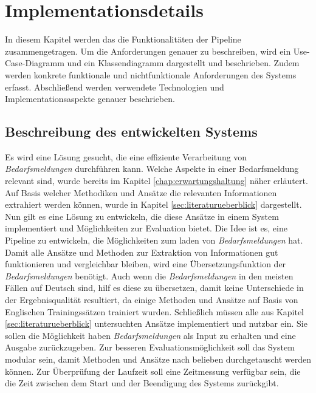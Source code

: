 \chapter{Implementationsdetails}
\label{chap:implementierung}
In diesem Kapitel werden das die Funktionalitäten der Pipeline zusammengetragen. Um die Anforderungen genauer zu beschreiben, wird ein Use-Case-Diagramm und ein Klassendiagramm dargestellt und beschrieben. Zudem werden konkrete funktionale und nichtfunktionale Anforderungen des Systems erfasst. Abschließend werden verwendete Technologien und Implementationsaspekte genauer beschrieben.
\section{Beschreibung des entwickelten Systems}
\label{sec:beschreibungsystem}
Es wird eine Lösung gesucht, die eine effiziente Verarbeitung von \emph{Bedarfsmeldungen} durchführen kann. Welche Aspekte in einer Bedarfsmeldung relevant sind, wurde bereits im Kapitel \ref{chap:erwartungshaltung} näher erläutert. Auf Basis welcher Methodiken und Ansätze die relevanten Informationen extrahiert werden können, wurde in Kapitel \ref{sec:literaturueberblick} dargestellt. Nun gilt es eine Lösung zu entwickeln, die diese Ansätze in einem System implementiert und Möglichkeiten zur Evaluation bietet. Die Idee ist es, eine Pipeline zu entwickeln, die Möglichkeiten zum laden von \emph{Bedarfsmeldungen} hat. Damit alle Ansätze und Methoden zur Extraktion von Informationen gut funktionieren und vergleichbar bleiben, wird eine Übersetzungsfunktion der \emph{Bedarfsmeldungen} benötigt. Auch wenn die \emph{Bedarfsmeldungen} in den meisten Fällen auf Deutsch sind, hilf es diese zu übersetzen, damit keine Unterschiede in der Ergebnisqualität resultiert, da einige Methoden und Ansätze auf Basis von Englischen Trainingssätzen trainiert wurden. Schließlich müssen alle aus Kapitel \ref{sec:literaturueberblick} untersuchten Ansätze implementiert und nutzbar ein. Sie sollen die Möglichkeit haben \emph{Bedarfsmeldungen} als Input zu erhalten und eine Ausgabe zurückzugeben. Zur besseren Evaluationsmöglichkeit soll das System modular sein, damit Methoden und Ansätze nach belieben durchgetauscht werden können. Zur Überprüfung der Laufzeit soll eine Zeitmessung verfügbar sein, die die Zeit zwischen dem Start und der Beendigung des Systems zurückgibt.\\

\newpage
